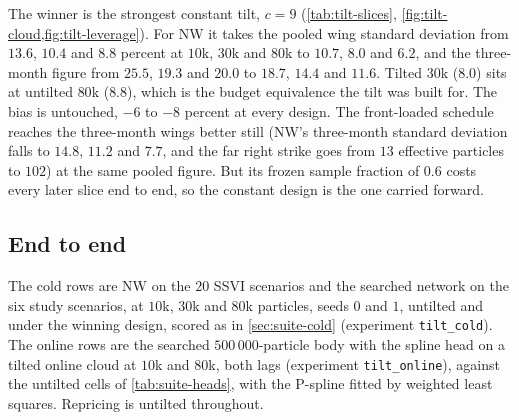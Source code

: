 \documentclass[11pt,a4paper]{article}
\newcommand{\code}[1]{\texttt{#1}}
\begin{document}
The winner is the strongest constant tilt, $c=9$ (\cref{tab:tilt-slices}, \cref{fig:tilt-cloud,fig:tilt-leverage}). For NW it takes the pooled wing standard deviation from $13.6$, $10.4$ and $8.8$ percent at $10$k, $30$k and $80$k to $10.7$, $8.0$ and $6.2$, and the three-month figure from $25.5$, $19.3$ and $20.0$ to $18.7$, $14.4$ and $11.6$. Tilted $30$k ($8.0$) sits at untilted $80$k ($8.8$), which is the budget equivalence the tilt was built for. The bias is untouched, $-6$ to $-8$ percent at every design. The front-loaded schedule reaches the three-month wings better still (NW's three-month standard deviation falls to $14.8$, $11.2$ and $7.7$, and the far right strike goes from $13$ effective particles to $102$) at the same pooled figure. But its frozen sample fraction of $0.6$ costs every later slice end to end, so the constant design is the one carried forward.

\subsection{End to end}\label{sec:tilt-e2e}
The cold rows are NW on the $20$ SSVI scenarios and the searched network on the six study scenarios, at $10$k, $30$k and $80$k particles, seeds $0$ and $1$, untilted and under the winning design, scored as in \cref{sec:suite-cold} (experiment \code{tilt\_cold}). The online rows are the searched $500\,000$-particle body with the spline head on a tilted online cloud at $10$k and $80$k, both lags (experiment \code{tilt\_online}), against the untilted cells of \cref{tab:suite-heads}, with the P-spline fitted by weighted least squares. Repricing is untilted throughout.

\begin{table}[h]\centering\footnotesize
\caption{Cold calibration with and without the tilt by budget: pooled, wings, three-month and liquid MAE in vol bp, leverage RMSE against the PDE reference, the minimum per-slice effective sample fraction, and median seconds. NW rows are over the $20$ SSVI scenarios; the network rows are over the six study scenarios, as their labels say, and the floor row is over the $20$. Bold: smallest in each column over all rows but the floor, so a bold tilted row at a small budget reads as budget equivalence.}\label{tab:tilt-cold}
\resizebox{\textwidth}{!}{}
\end{table}

\begin{table}[h]\centering\footnotesize
\caption{Searched body with the spline head on an untilted and a tilted online cloud, by online budget and lag: pooled, wings and liquid MAE in vol bp and online seconds.}\label{tab:tilt-online}

\end{table}
\end{document}
